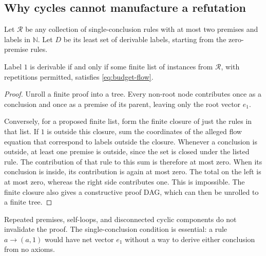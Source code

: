 \subsection{Why cycles cannot manufacture a refutation}

Let $\mathcal R$ be any collection of single-conclusion rules with at most
two premises and labels in $\mathbb N$.  Let $D$ be its least set of
derivable labels, starting from the zero-premise rules.

\begin{budgetlemma}
Label $1$ is derivable if and only if some finite list of instances from
$\mathcal R$, with repetitions permitted, satisfies
\eqref{eq:budget-flow}.
\end{budgetlemma}
\begin{proof}
Unroll a finite proof into a tree.  Every non-root node contributes once
as a conclusion and once as a premise of its parent, leaving only the
root vector $e_1$.

Conversely, for a proposed finite list, form the finite closure of just
the rules in that list.  If $1$ is outside this closure, sum the coordinates
of the alleged flow equation that correspond to labels outside the closure.
Whenever a conclusion is outside, at least one premise is outside, since
the set is closed under the listed rule.  The contribution of that rule
to this sum is therefore at most zero.  When its conclusion is inside,
its contribution is again at most zero.  The total on the left is at most
zero, whereas the right side contributes one.  This is impossible.
The finite closure also gives a constructive proof DAG, which can then be
unrolled to a finite tree.
\end{proof}

Repeated premises, self-loops, and disconnected cyclic components do not
invalidate the proof.  The single-conclusion condition is essential: a
rule $a\longrightarrow(a,1)$ would have net vector $e_1$ without a way to
derive either conclusion from no axioms.

